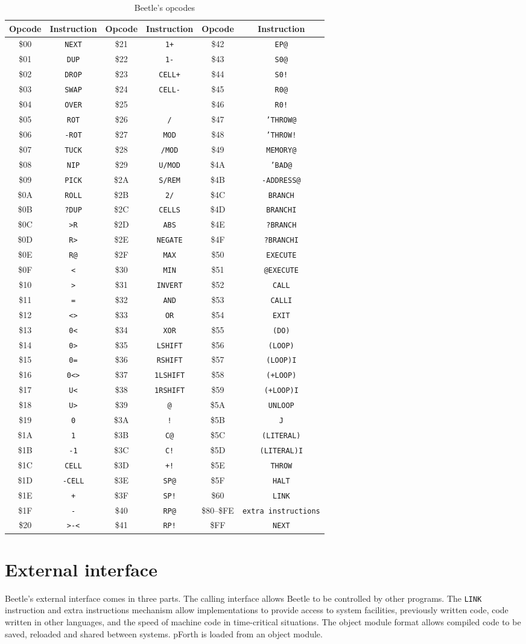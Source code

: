 \documentclass{article}
\newcommand{\opcodetbl}[6]{\$#1 & {\tt #2} & \$#3 & {\tt #4} & \$#5 & {\tt #6}
\\}
\begin{document}
\begin{table}[htb]
\begin{center}
\begin{tabular}{*{3}{cc}} \toprule
\bf Opcode & \bf Instruction & \bf Opcode & \bf
    Instruction & \bf Opcode & \bf Instruction \\ \midrule
\opcodetbl{00}{NEXT}	{21}{1+}	{42}{EP@}
\opcodetbl{01}{DUP}	{22}{1-}	{43}{S0@}
\opcodetbl{02}{DROP}	{23}{CELL+}	{44}{S0!}
\opcodetbl{03}{SWAP}	{24}{CELL-}	{45}{R0@}
\opcodetbl{04}{OVER}	{25}{*}		{46}{R0!}
\opcodetbl{05}{ROT}	{26}{/}		{47}{'THROW@}
\opcodetbl{06}{-ROT}	{27}{MOD}	{48}{'THROW!}
\opcodetbl{07}{TUCK}	{28}{/MOD}	{49}{MEMORY@}
\opcodetbl{08}{NIP}	{29}{U/MOD}	{4A}{'BAD@}
\opcodetbl{09}{PICK}	{2A}{S/REM}	{4B}{-ADDRESS@}
\opcodetbl{0A}{ROLL}	{2B}{2/}	{4C}{BRANCH}
\opcodetbl{0B}{?DUP}	{2C}{CELLS}	{4D}{BRANCHI}
\opcodetbl{0C}{>R}	{2D}{ABS}	{4E}{?BRANCH}
\opcodetbl{0D}{R>}	{2E}{NEGATE}	{4F}{?BRANCHI}
\opcodetbl{0E}{R@}	{2F}{MAX}	{50}{EXECUTE}
\opcodetbl{0F}{<}	{30}{MIN}	{51}{@EXECUTE}
\opcodetbl{10}{>}	{31}{INVERT}	{52}{CALL}
\opcodetbl{11}{=}	{32}{AND}	{53}{CALLI}
\opcodetbl{12}{<>}	{33}{OR}	{54}{EXIT}
\opcodetbl{13}{0<}	{34}{XOR}	{55}{(DO)}
\opcodetbl{14}{0>}	{35}{LSHIFT}	{56}{(LOOP)}
\opcodetbl{15}{0=}	{36}{RSHIFT}	{57}{(LOOP)I}
\opcodetbl{16}{0<>}	{37}{1LSHIFT}	{58}{(+LOOP)}
\opcodetbl{17}{U<}	{38}{1RSHIFT}	{59}{(+LOOP)I}
\opcodetbl{18}{U>}	{39}{@}		{5A}{UNLOOP}
\opcodetbl{19}{0}	{3A}{!}		{5B}{J}
\opcodetbl{1A}{1}	{3B}{C@}	{5C}{(LITERAL)}
\opcodetbl{1B}{-1}	{3C}{C!}        {5D}{(LITERAL)I}
\opcodetbl{1C}{CELL}	{3D}{+!}        {5E}{THROW}
\opcodetbl{1D}{-CELL}	{3E}{SP@}	{5F}{HALT}
\opcodetbl{1E}{+}	{3F}{SP!}       {60}{LINK}
\opcodetbl{1F}{-}	{40}{RP@}	{80–\$FE}{\textrm{extra instructions}}
\opcodetbl{20}{>-<}	{41}{RP!}       {FF}{NEXT}
 \bottomrule
\end{tabular}
\caption{\label{opcodetable}Beetle's opcodes}
\end{center}
\end{table}


\section{External interface}

Beetle's external interface comes in three parts. The calling interface allows
Beetle to be controlled by other programs. The {\tt LINK} instruction and extra instructions mechanism allow implementations to provide access to system facilities, previously written code,
code written in other languages, and the speed of machine code in time-critical
situations. The object module format allows compiled code to be saved, reloaded
and shared between systems. pForth is loaded from an object module.
\end{document}
